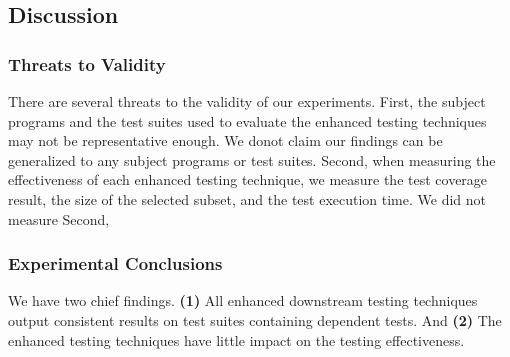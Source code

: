 \subsection{Discussion}

\subsubsection{Threats to Validity}

There are several threats to the validity
of our experiments. 
First, the subject programs and the test suites
used to evaluate the enhanced testing techniques may
not be representative enough. We donot claim
our findings can be generalized to any subject
programs or test suites. Second,
when measuring the effectiveness of each enhanced
testing technique, we measure the test coverage
result, the size of the selected subset, and
the test execution time. We did not measure
Second,

\subsubsection{Experimental Conclusions}

We have two chief findings. 
\textbf{(1)} All enhanced downstream testing techniques
output consistent results on test suites
containing dependent tests. And \textbf{(2)}
The enhanced testing techniques have
little impact on the testing effectiveness.
